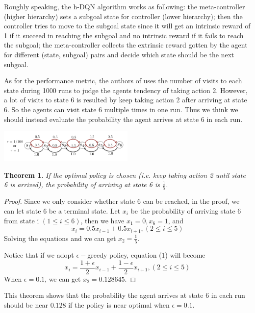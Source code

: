 \documentclass{article}
\newtheorem{theorem}{Theorem}
\begin{document}
\begin{spacing}{1.1}
    Roughly speaking, the h-DQN algorithm works as following: the meta-controller (higher hierarchy) sets a subgoal state for controller (lower hierarchy); then the controller tries to move to the subgoal state since it will get an intrinsic reward of 1 if it succeed in reaching the subgoal and no intrinsic reward if it fails to reach the subgoal; the meta-controller collects the extrinsic reward gotten by the agent for different (state, subgoal) pairs and decide which state should be the next subgoal.

    As for the performance metric, the authors of \cite{AI-16} uses the number of visits to each state during 1000 runs to judge the agents tendency of taking action 2. However, a lot of visits to state 6 is resulted by keep taking action 2 after arriving at state 6. So the agents can visit state 6 multiple times in one run. Thus we think we should instead evaluate the probability the agent arrives at state 6 in each run.
    \begin{center}
        \includegraphics[width = 0.5\textwidth]{game.png}
    \end{center}
    \begin{theorem}
    If the optimal policy is chosen (i.e. keep taking action 2 until state 6 is arrived), the probability of arriving at state 6 is $\frac{1}{5}$.
    \end{theorem}
    \begin{proof}
        Since we only consider whether state 6 can be reached, in the proof, we can let state 6 be a terminal state. Let $x_i$ be the probability of arriving state 6 from state i $(1\leq i \leq 6)$, then we have $x_1 = 0, x_6 = 1$, and
        \begin{equation}
            x_i = 0.5x_{i-1} + 0.5x_{i+1}, (2\leq i \leq 5)
        \end{equation}
        Solving the equations and we can get $x_2 = \frac{1}{5}$.

        Notice that if we adopt $\epsilon -$greedy policy, equation (1) will become
        \begin{equation}
            x_i = \frac{1 + \epsilon}{2}x_{i-1} + \frac{1 - \epsilon}{2}x_{i+1}, (2\leq i \leq 5)
        \end{equation}
        When $\epsilon = 0.1$, we can get $x_2 = 0.128645$.
    \end{proof}
    This theorem shows that the probability the agent arrives at state 6 in each run should be near $0.128$ if the policy is near optimal when $\epsilon = 0.1$.


\end{spacing}
\end{document}
